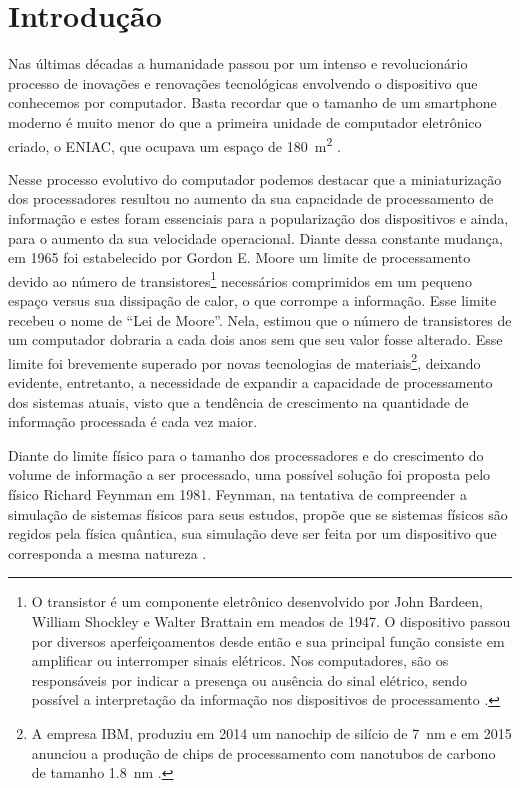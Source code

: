 \chapter{Introdução}

Nas últimas décadas a humanidade passou por um intenso e revolucionário processo de inovações e renovações tecnológicas envolvendo o dispositivo que conhecemos por computador. Basta recordar que o tamanho de um smartphone moderno é muito menor do que a primeira unidade de computador eletrônico criado, o ENIAC, que ocupava um espaço de \SI{180}{\square\meter} \cite{eniac}.

Nesse processo evolutivo do computador podemos destacar que a miniaturização dos processadores resultou no aumento da sua capacidade de processamento de informação e estes foram essenciais para a popularização dos dispositivos e ainda, para o aumento da sua velocidade operacional. Diante dessa constante mudança, em 1965 foi estabelecido por Gordon E. Moore um limite de processamento devido ao número de transistores\footnote{O transistor é um componente eletrônico desenvolvido por John Bardeen, William Shockley e Walter Brattain em meados de 1947. O dispositivo passou por diversos aperfeiçoamentos desde então e sua principal função consiste em amplificar ou interromper sinais elétricos. Nos computadores, são os responsáveis por indicar a presença ou ausência do sinal elétrico, sendo possível a interpretação da informação nos dispositivos de processamento \cite{transistor}.} necessários comprimidos em um pequeno espaço versus sua dissipação de calor, o que corrompe a informação. Esse limite recebeu o nome de ``Lei de Moore''. Nela, \textcite{moore} estimou que o número de transistores de um computador dobraria a cada dois anos sem que seu valor fosse alterado. Esse limite foi brevemente superado por novas tecnologias de materiais\footnote{A empresa IBM, produziu em 2014 um nanochip de silício de \SI{7}{\nano\meter} e em 2015 anunciou a produção de chips de processamento com nanotubos de carbono de tamanho \SI{1.8}{\nano\meter} \cite{chipibm}.}, deixando evidente, entretanto, a necessidade de expandir a capacidade de processamento dos sistemas atuais, visto que a tendência de crescimento na quantidade de informação processada é cada vez maior.

Diante do limite físico para o tamanho dos processadores e do crescimento do volume de informação a ser processado, uma possível solução foi proposta pelo físico Richard Feynman em 1981. Feynman, na tentativa de compreender a simulação de sistemas físicos para seus estudos, propõe que se sistemas físicos são regidos pela física quântica, sua simulação deve ser feita por um dispositivo que corresponda a mesma natureza \cite{caldeira}.

